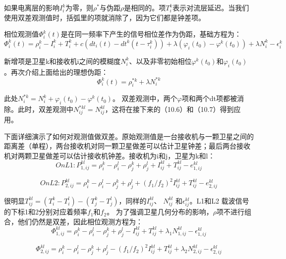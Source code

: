 如果电离层的影响$I_{i}^{k}$为零，则$\rho^{*}$与伪距$\rho$是相同的。项$T_{i}^{k}$表示对流层延迟。当我们使用双差观测值时，括弧里的项就消除了，因为它们都是钟差项。

相位观测值$\Phi_{i}^{k}(t)$是在同一频率下产生的信号相位差作为伪距，基础方程为：
\begin{equation}
	\Phi_{i}^{k}(t)=\rho_{i}^{k}-I_{i}^{k}+T_{i}^{k}+c(dt_{i}(t)-dt^{k}(t-\tau_{i}^{k}))+\lambda(\varphi_{i}(t_{0})-\varphi^{k}(t_{0}))+\lambda N_{i}^{k}-\epsilon_{i}^{k}
\end{equation}

新增项是卫星k和接收机i之间的模糊度$N_{i}^{k}$、以及非零初始相位$\varphi^{k}(t_{0})$和$\varphi_{i}(t_{0})$。再次介绍上面给出的理想伪距：
\begin{equation}
	\Phi_{i}^{k}(t)=\rho_{i}^{*k}+\lambda N_{i}^{*k}
\end{equation}

此处$N_{i}^{*k}=N_{i}^{k}+\varphi_{i}(t_{0})-\varphi^{k}(t_{0})$。 双差观测中，两个$\varphi$项和两个dt项都被消除。此时，双差观测中$N_{ij}^{*kl}=N_{ij}^{kl}$，这将在接下来的（10.6）和（10.7）得到应用。

下面详细演示了如何对观测值做双差。原始观测值是一台接收机与一颗卫星之间的距离差（单程），两台接收机对同一颗卫星做差可以估计卫星钟差；最后两台接收机对两颗卫星做差可以估计接收机钟差。接收机为i和j，卫星为k和l：
\begin{equation}
	On L1: P_{1,ij}^{kl}=\rho_{i}^{k}-\rho_{i}^{l}-\rho_{j}^{k}+\rho_{j}^{l}+I_{ij}^{kl}+T_{ij}^{kl}-e_{1,ij}^{kl}
\end{equation}

\begin{equation}
	On L2: P_{2,ij}^{kl}=\rho_{i}^{k}-\rho_{i}^{l}-\rho_{j}^{k}+\rho_{j}^{l}+(f_{1}/f_{2})^{2}I_{ij}^{kl}+T_{ij}^{kl}-e_{2,ij}^{kl}
\end{equation}

很明显$T_{ij}^{kl}=(T_{i}^{k}-T_{i}^{l})-(T_{j}^{k}-T_{j}^{l})$，同样的$I_{ij}^{kl}$、 $N_{ij}^{kl}$ 和$\epsilon_{ij}^{kl}$。L1和L2 载波信号的下标1和2分别对应着频率$f_{1}$和$f_{2}$。 为了强调卫星几何分布的影响，$\rho$项不进行组合，他们仍然是双差，因此相位观测方程为：
\begin{equation}
	\Phi_{1,ij}^{kl}=\rho_{i}^{k}-\rho_{i}^{l}-\rho_{j}^{k}+\rho_{j}^{l}-I_{ij}^{kl}+T_{ij}^{kl}+\lambda_{1} N_{1,ij}^{kl}-\epsilon_{1,ij}^{kl}
\end{equation}

\begin{equation} \Phi_{2,ij}^{kl}=\rho_{i}^{k}-\rho_{i}^{l}-\rho_{j}^{k}+\rho_{j}^{l}-(f_{1}/f_{2})^{2}I_{ij}^{kl}+T_{ij}^{kl}+\lambda_{2} N_{2,ij}^{kl}-\epsilon_{2,ij}^{kl}
\end{equation}

